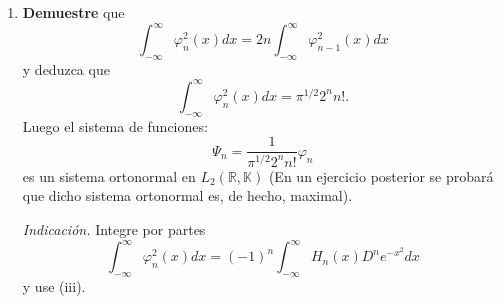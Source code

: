 \documentclass[12pt]{report}
\newcounter{it}
\theoremstyle{largebreak}
\begin{document}
\begin{excer}
\begin{enumerate}
            \item \textbf{Demuestre} que
            \begin{equation*}
                \int_{-\infty}^\infty\varphi_n^2(x)dx=2n\int_{-\infty}^\infty\varphi_{n-1}^2(x)dx
            \end{equation*}
            y deduzca que
            \begin{equation*}
                \int_{-\infty}^\infty\varphi_n^2(x)dx=\pi^{1/2}2^nn!.
            \end{equation*}
            Luego el sistema de funciones:
            \begin{equation*}
                \Psi_n=\frac{1}{\pi^{1/2}2^nn!}\varphi_n
            \end{equation*}
            es un sistema ortonormal en $L_2(\mathbb{R},\mathbb{K})$ (En un ejercicio posterior se probará que dicho sistema ortonormal es, de hecho, maximal).

            \textit{Indicación.} Integre por partes
            \begin{equation*}
                \int_{-\infty}^\infty\varphi_n^2(x)dx=(-1)^n\int_{-\infty}^\infty H_n(x)D^ne^{-x^2}dx
            \end{equation*}
            y use (iii).
        \end{enumerate}
    \end{excer}
\end{document}
